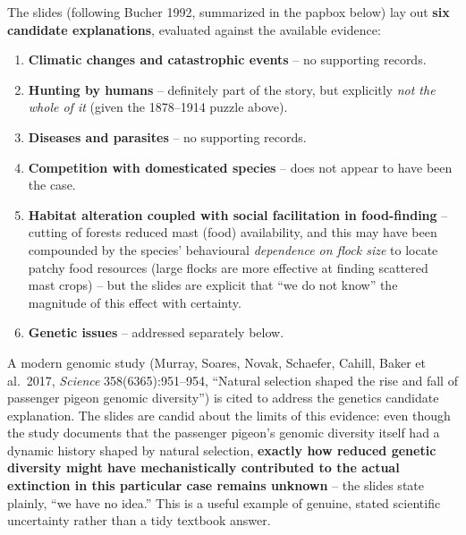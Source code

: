 \documentclass[11pt,a4paper]{article}
\begin{document}
The slides (following Bucher 1992, summarized in the papbox below) lay out \textbf{six candidate explanations}, evaluated against the available evidence:
\begin{enumerate}[leftmargin=1.5em]
\item \textbf{Climatic changes and catastrophic events} -- no supporting records.
\item \textbf{Hunting by humans} -- definitely part of the story, but explicitly \emph{not the whole of it} (given the 1878--1914 puzzle above).
\item \textbf{Diseases and parasites} -- no supporting records.
\item \textbf{Competition with domesticated species} -- does not appear to have been the case.
\item \textbf{Habitat alteration coupled with social facilitation in food-finding} -- cutting of forests reduced mast (food) availability, and this may have been compounded by the species' behavioural \emph{dependence on flock size} to locate patchy food resources (large flocks are more effective at finding scattered mast crops) -- but the slides are explicit that ``we do not know'' the magnitude of this effect with certainty.
\item \textbf{Genetic issues} -- addressed separately below.
\end{enumerate}

\begin{keybox}[title={The genetics angle: Murray et al.\ (2017), \textit{Science}}]
A modern genomic study (Murray, Soares, Novak, Schaefer, Cahill, Baker et al.\ 2017, \textit{Science} 358(6365):951--954, ``Natural selection shaped the rise and fall of passenger pigeon genomic diversity'') is cited to address the genetics candidate explanation. The slides are candid about the limits of this evidence: even though the study documents that the passenger pigeon's genomic diversity itself had a dynamic history shaped by natural selection, \textbf{exactly how reduced genetic diversity might have mechanistically contributed to the actual extinction in this particular case remains unknown} -- the slides state plainly, ``we have no idea.'' This is a useful example of genuine, stated scientific uncertainty rather than a tidy textbook answer.
\end{keybox}
\end{document}
